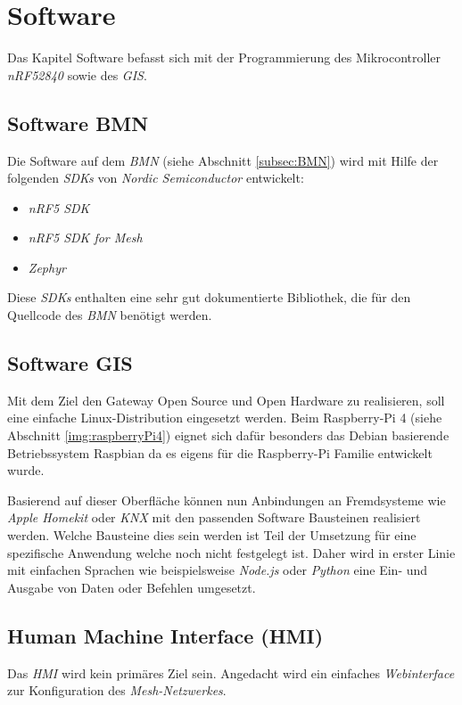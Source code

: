 \clearpage
\section{Software}\label{sec:Software}
Das Kapitel Software befasst sich mit der Programmierung des Mikrocontroller \textit{nRF52840} sowie des \textit{GIS}.

\subsection{Software BMN}\label{subsec:SoftwareBMN}
Die Software auf dem \textit{BMN} (siehe Abschnitt \ref{subsec:BMN}) wird mit Hilfe der folgenden \textit{SDKs} von \textit{Nordic Semiconductor} entwickelt:

 \begin{itemize} 
	\item \textit{nRF5 SDK}\cite{nordic_semiconductor_nrf5_2019}
	\item \textit{nRF5 SDK for Mesh}\cite{nordic_semiconductor_nrf5_2019-1}
	\item \textit{Zephyr}\cite{zephyr_project_zephyr_2019}
\end{itemize}

Diese \textit{SDKs} enthalten eine sehr gut dokumentierte Bibliothek, die für den Quellcode des \textit{BMN} benötigt werden.


\subsection{Software GIS}\label{subsec:SoftwareGIS}
Mit dem Ziel den Gateway Open Source und Open Hardware zu realisieren, soll eine einfache Linux-Distribution eingesetzt werden. Beim Raspberry-Pi 4 (siehe Abschnitt \ref{img:raspberryPi4}) eignet sich dafür besonders das Debian basierende Betriebssystem Raspbian da es eigens für die Raspberry-Pi Familie entwickelt wurde.

Basierend auf dieser Oberfläche können nun Anbindungen an Fremdsysteme wie \textit{Apple Homekit} oder \textit{KNX} mit den passenden Software Bausteinen realisiert werden. Welche Bausteine dies sein werden ist Teil der Umsetzung für eine spezifische Anwendung welche noch nicht festgelegt ist. Daher wird in erster Linie mit einfachen Sprachen wie beispielsweise \textit{Node.js} oder \textit{Python} eine Ein- und Ausgabe von Daten oder Befehlen umgesetzt. 

\subsection{Human Machine Interface (HMI)}\label{subsec:HMI_SW}
Das \textit{HMI} wird kein primäres Ziel sein. Angedacht wird ein einfaches \textit{Webinterface} zur Konfiguration des \textit{Mesh-Netzwerkes}.

